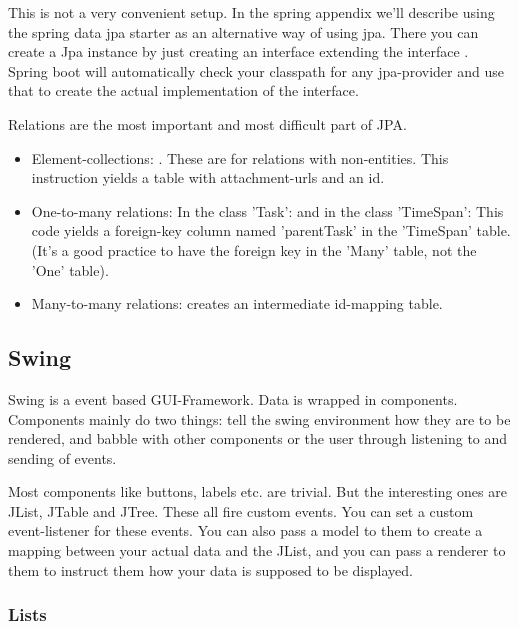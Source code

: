This is not a very convenient setup. In the spring appendix we'll describe using the spring data jpa starter as an alternative way of using jpa. There you can create a Jpa instance by just creating an interface extending the interface .  Spring boot will automatically check your classpath for any jpa-provider and use that to create the actual implementation of the interface. 


Relations are the most important and most difficult part of JPA.

\begin{itemize}
	\item Element-collections: . These are for relations with non-entities. This instruction yields a table with attachment-urls and an id.
	\item One-to-many relations: In the class 'Task':  and in the class 'TimeSpan':  This code yields a foreign-key column named 'parentTask' in the 'TimeSpan' table. (It's a good practice to have the foreign key in the 'Many' table, not the 'One' table).
	\item Many-to-many relations: creates an intermediate id-mapping table.
\end{itemize}

\subsection{Swing}
 
 Swing is a event based GUI-Framework.
 Data is wrapped in components. Components mainly do two things: tell the swing environment how they are to be rendered, and babble with other components or the user through listening to and sending of events. 
 
 
 Most components like buttons, labels etc. are trivial. But the interesting ones are JList, JTable and JTree. These all fire custom events. 
 You can set a custom event-listener for these events. You can also pass a model to them to create a mapping between your actual data and the JList, and you can pass a renderer to them to instruct them how your data is supposed to be displayed. 
 
 
 \subsubsection{Lists}
 
